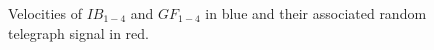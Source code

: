 \begin{figure}%
    \centering
    \caption{Velocities of $IB_{1-4}$ and $GF_{1-4}$ in blue and their associated random telegraph signal in red.}
    \label{fig:RTS_first}
    \vspace{-15mm}
\end{figure}

